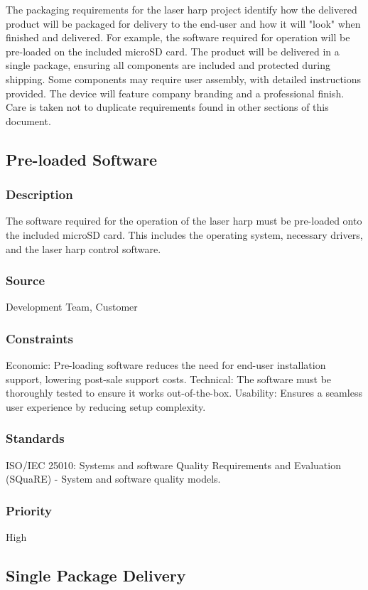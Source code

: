 The packaging requirements for the laser harp project identify how the delivered product will be packaged for delivery to the end-user and how it will "look" when finished and delivered. For example, the software required for operation will be pre-loaded on the included microSD card. The product will be delivered in a single package, ensuring all components are included and protected during shipping. Some components may require user assembly, with detailed instructions provided. The device will feature company branding and a professional finish. Care is taken not to duplicate requirements found in other sections of this document.


\subsection{Pre-loaded Software}
\subsubsection{Description}
The software required for the operation of the laser harp must be pre-loaded onto the included microSD card. This includes the operating system, necessary drivers, and the laser harp control software.
\subsubsection{Source}
Development Team, Customer
\subsubsection{Constraints}
Economic: Pre-loading software reduces the need for end-user installation support, lowering post-sale support costs.
Technical: The software must be thoroughly tested to ensure it works out-of-the-box.
Usability: Ensures a seamless user experience by reducing setup complexity.
\subsubsection{Standards}
ISO/IEC 25010: Systems and software Quality Requirements and Evaluation (SQuaRE) - System and software quality models.
\subsubsection{Priority}
High


\subsection{Single Package Delivery}
